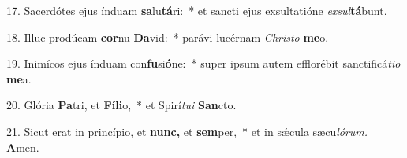 \item 17. Sacerdótes ejus índuam \textbf{sa}lu\textbf{tá}ri:~* et sancti ejus exsultatióne \textit{exsul}\textbf{tá}bunt.
\item 18. Illuc prodúcam \textbf{cor}nu \textbf{Da}vid:~* parávi lucérnam \textit{Christo} \textbf{me}o.
\item 19. Inimícos ejus índuam con\textbf{fu}si\textbf{ó}ne:~* super ipsum autem efflorébit sanctificá\hspace{0.03em}\textit{tio} \textbf{me}a.
\item 20. Glória \textbf{Pa}tri, et \textbf{Fí}\textbf{li}o,~* et Spirí\hspace{0.03em}\textit{tui} \textbf{San}cto.
\item 21. Sicut erat in princípio, et \textbf{nunc,} et \textbf{sem}per,~* et in sǽcula sæcu\hspace{0.03em}\textit{lórum.} \textbf{A}men.
